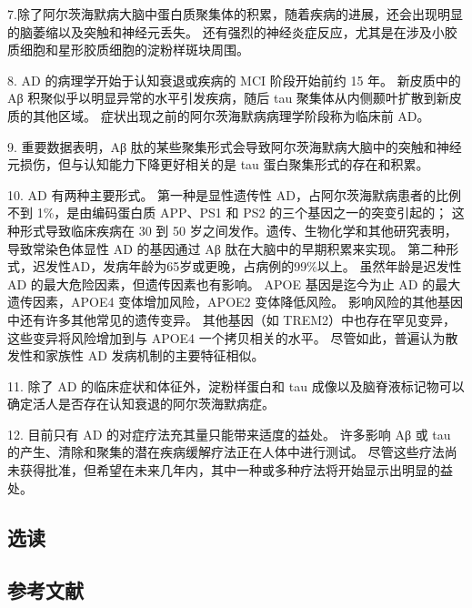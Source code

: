 7.除了阿尔茨海默病大脑中蛋白质聚集体的积累，随着疾病的进展，还会出现明显的脑萎缩以及突触和神经元丢失。 还有强烈的神经炎症反应，尤其是在涉及小胶质细胞和星形胶质细胞的淀粉样斑块周围。 

8. AD 的病理学开始于认知衰退或疾病的 MCI 阶段开始前约 15 年。 新皮质中的 Aβ 积聚似乎以明显异常的水平引发疾病，随后 tau 聚集体从内侧颞叶扩散到新皮质的其他区域。 症状出现之前的阿尔茨海默病病理学阶段称为临床前 AD。 

9. 重要数据表明，Aβ 肽的某些聚集形式会导致阿尔茨海默病大脑中的突触和神经元损伤，但与认知能力下降更好相关的是 tau 蛋白聚集形式的存在和积累。 

10. AD 有两种主要形式。 第一种是显性遗传性 AD，占阿尔茨海默病患者的比例不到 1\%，是由编码蛋白质 APP、PS1 和 PS2 的三个基因之一的突变引起的； 这种形式导致临床疾病在 30 到 50 岁之间发作。遗传、生物化学和其他研究表明，导致常染色体显性 AD 的基因通过 Aβ 肽在大脑中的早期积累来实现。 第二种形式，迟发性AD，发病年龄为65岁或更晚，占病例的99\%以上。 虽然年龄是迟发性 AD 的最大危险因素，但遗传因素也有影响。 APOE 基因是迄今为止 AD 的最大遗传因素，APOE4 变体增加风险，APOE2 变体降低风险。 影响风险的其他基因中还有许多其他常见的遗传变异。 其他基因（如 TREM2）中也存在罕见变异，这些变异将风险增加到与 APOE4 一个拷贝相关的水平。 尽管如此，普遍认为散发性和家族性 AD 发病机制的主要特征相似。 

11. 除了 AD 的临床症状和体征外，淀粉样蛋白和 tau 成像以及脑脊液标记物可以确定活人是否存在认知衰退的阿尔茨海默病症。 

12. 目前只有 AD 的对症疗法充其量只能带来适度的益处。 许多影响 Aβ 或 tau 的产生、清除和聚集的潜在疾病缓解疗法正在人体中进行测试。 尽管这些疗法尚未获得批准，但希望在未来几年内，其中一种或多种疗法将开始显示出明显的益处。
\subsection{选读}
\subsection{参考文献}